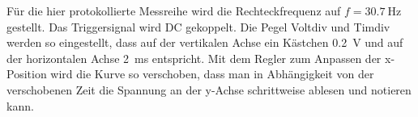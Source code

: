 \noindent
Für die hier protokollierte Messreihe wird die Rechteckfrequenz auf $f = \qty{30.7}{\hertz}$ gestellt.
Das Triggersignal wird DC gekoppelt.
Die Pegel Voltdiv und Timdiv werden so eingestellt, 
dass auf der vertikalen Achse ein Kästchen \qty[]{0.2}{\volt} und auf der horizontalen Achse \qty{2}{\ms} entspricht.
Mit dem Regler zum Anpassen der x-Position wird die Kurve so verschoben, 
dass man in Abhängigkeit von der verschobenen Zeit die Spannung an der y-Achse schrittweise ablesen und notieren kann.